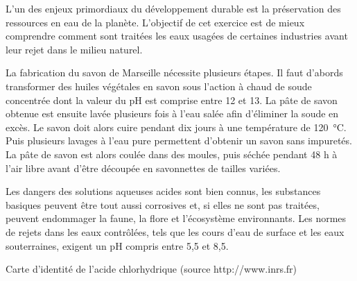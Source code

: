 \bigskip
{}

\medskip
L'un des enjeux primordiaux du développement durable est la préservation des ressources en eau de la planète.
L'objectif de cet exercice est de mieux comprendre comment sont traitées les eaux usagées de certaines industries avant leur rejet dans le milieu naturel.

\medskip
La fabrication du savon de Marseille nécessite plusieurs étapes. %
Il faut d'abords transformer des huiles végétales en savon sous l'action à chaud de soude concentrée dont la valeur du pH est comprise entre 12 et 13.
La pâte de savon obtenue est ensuite lavée plusieurs fois à l'eau salée afin d'éliminer la soude en excès.
Le savon doit alors cuire pendant dix jours à une température de \qty{120}{\degreeCelsius}.
Puis plusieurs lavages à l'eau pure permettent d'obtenir un savon sans impuretés.
La pâte de savon est alors coulée dans des moules, puis séchée pendant 48 h à l'air libre avant d'être découpée en savonnettes de tailles variées.

\medskip
Les dangers des solutions aqueuses acides sont bien connus, les substances basiques peuvent être tout aussi corrosives et, si elles ne sont pas traitées, peuvent endommager la faune, la flore et l'écosystème environnants.
Les normes de rejets dans les eaux contrôlées, tels que les cours d'eau de surface et les eaux souterraines, exigent un pH compris entre 5,5 et 8,5.




\medskip
\begin{boite}
  \begin{center}  
    Carte d'identité de l'acide chlorhydrique (source http://www.inrs.fr)
  \end{center}
  
\end{boite}

